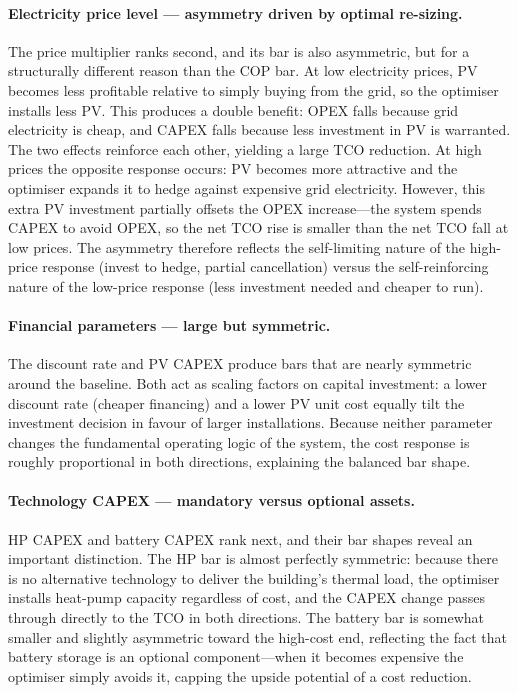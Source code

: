\documentclass[11pt,a4paper]{report}
\begin{document}
\paragraph{Electricity price level --- asymmetry driven by optimal re-sizing.}
The price multiplier ranks second, and its bar is also asymmetric, but for a
structurally different reason than the COP bar.
At low electricity prices, PV becomes less profitable relative to simply
buying from the grid, so the optimiser installs less PV.
This produces a double benefit: OPEX falls because grid electricity is cheap,
and CAPEX falls because less investment in PV is warranted.
The two effects reinforce each other, yielding a large TCO reduction.
At high prices the opposite response occurs: PV becomes more attractive and
the optimiser expands it to hedge against expensive grid electricity.
However, this extra PV investment partially offsets the OPEX increase---the
system spends CAPEX to avoid OPEX, so the net TCO rise is smaller than the
net TCO fall at low prices.
The asymmetry therefore reflects the self-limiting nature of the high-price
response (invest to hedge, partial cancellation) versus the self-reinforcing
nature of the low-price response (less investment needed and cheaper to run).

\paragraph{Financial parameters --- large but symmetric.}
The discount rate and PV CAPEX produce bars that are nearly symmetric around
the baseline.
Both act as scaling factors on capital investment: a lower discount rate
(cheaper financing) and a lower PV unit cost equally tilt the investment
decision in favour of larger installations.
Because neither parameter changes the fundamental operating logic of the
system, the cost response is roughly proportional in both directions,
explaining the balanced bar shape.

\paragraph{Technology CAPEX --- mandatory versus optional assets.}
HP CAPEX and battery CAPEX rank next, and their bar shapes reveal an
important distinction.
The HP bar is almost perfectly symmetric: because there is no alternative
technology to deliver the building's thermal load, the optimiser installs
heat-pump capacity regardless of cost, and the CAPEX change passes through
directly to the TCO in both directions.
The battery bar is somewhat smaller and slightly asymmetric toward the
high-cost end, reflecting the fact that battery storage is an optional
component---when it becomes expensive the optimiser simply avoids it, capping
the upside potential of a cost reduction.
\end{document}
